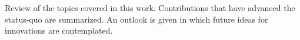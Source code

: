 Review of the topics covered in this work.
Contributions that have advanced the status-quo are summarized.
An outlook is given in which future ideas for innovations are contemplated.


